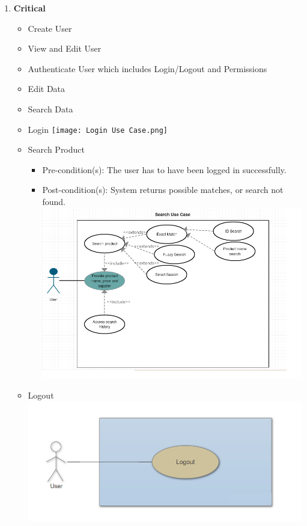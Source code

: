 \documentclass[a4paper,10pt]{article}
\begin{document}
		\begin{enumerate} 
		\item \textbf{Critical} 
		\begin{itemize}
		\item Create User
		\item View and Edit User
		\item Authenticate User which includes Login/Logout and Permissions
		\item Edit Data
		\item Search Data
		\end{itemize}
		
		\begin{itemize} 
			\item Login
			 \texttt{[image: Login Use Case.png]}\\
		 
			\item Search Product \\
			\begin{itemize}
				\item Pre-condition(s): The user has to have been logged in successfully.  \\
				\item Post-condition(s): System returns possible matches, or search not found. \\
 				\includegraphics[scale=0.35]{Diagrams/Search Use Case.png}
			\end{itemize}
			
			\item Logout\\
			\includegraphics[scale=0.5]{Diagrams/logout.png}\\


\end{itemize}
\end{enumerate}
\end{document}
